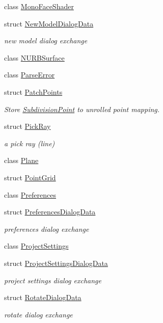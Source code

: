 \begin{DoxyCompactItemize}
class \hyperlink{classShipCAD_1_1MonoFaceShader}{Mono\+Face\+Shader}
\item 
struct \hyperlink{structShipCAD_1_1NewModelDialogData}{New\+Model\+Dialog\+Data}
\begin{DoxyCompactList}\small\item\em new model dialog exchange \end{DoxyCompactList}\item 
class \hyperlink{classShipCAD_1_1NURBSurface}{N\+U\+R\+B\+Surface}
\item 
class \hyperlink{classShipCAD_1_1ParseError}{Parse\+Error}
\item 
struct \hyperlink{structShipCAD_1_1PatchPoints}{Patch\+Points}
\begin{DoxyCompactList}\small\item\em Store \hyperlink{classShipCAD_1_1SubdivisionPoint}{Subdivision\+Point} to unrolled point mapping. \end{DoxyCompactList}\item 
struct \hyperlink{structShipCAD_1_1PickRay}{Pick\+Ray}
\begin{DoxyCompactList}\small\item\em a pick ray (line) \end{DoxyCompactList}\item 
class \hyperlink{classShipCAD_1_1Plane}{Plane}
\item 
struct \hyperlink{structShipCAD_1_1PointGrid}{Point\+Grid}
\item 
class \hyperlink{classShipCAD_1_1Preferences}{Preferences}
\item 
struct \hyperlink{structShipCAD_1_1PreferencesDialogData}{Preferences\+Dialog\+Data}
\begin{DoxyCompactList}\small\item\em preferences dialog exchange \end{DoxyCompactList}\item 
class \hyperlink{classShipCAD_1_1ProjectSettings}{Project\+Settings}
\item 
struct \hyperlink{structShipCAD_1_1ProjectSettingsDialogData}{Project\+Settings\+Dialog\+Data}
\begin{DoxyCompactList}\small\item\em project settings dialog exchange \end{DoxyCompactList}\item 
struct \hyperlink{structShipCAD_1_1RotateDialogData}{Rotate\+Dialog\+Data}
\begin{DoxyCompactList}\small\item\em rotate dialog exchange \end{DoxyCompactList}\item 

\end{DoxyCompactItemize}
